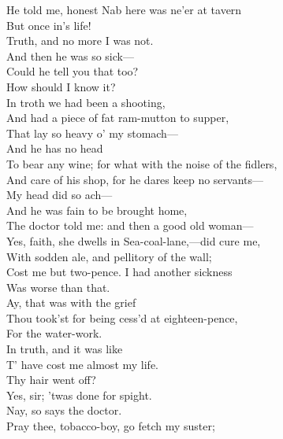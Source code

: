 \documentclass[a4paper,oneside]{memoir}
\begin{document}
\begin{drama*}
He told me, honest Nab here was ne'er at tavern\\
But once in's life!\\
\druggerspeaks {} Truth, and no more I was not.\\
\facespeaks And then he was so sick---\\
\druggerspeaks {} Could he tell you that too?\\
\facespeaks How should I know it?\\
\druggerspeaks {} In troth we had been a shooting,\\
And had a piece of fat ram-mutton to supper,\\
That lay so heavy o' my stomach---\\
\facespeaks {} And he has no head\\
To bear any wine; for what with the noise of the fidlers,\\
And care of his shop, for he dares keep no servants---\\
\druggerspeaks My head did so ach---\\
\facespeaks {} And he was fain to be brought home,\\
The doctor told me: and then a good old woman---\\
\druggerspeaks Yes, faith, she dwells in Sea-coal-lane,---did cure me,\\
With sodden ale, and pellitory of the wall;\\
Cost me but two-pence. I had another sickness\\
Was worse than that.\\
\facespeaks {} Ay, that was with the grief\\
Thou took'st for being cess'd at eighteen-pence,\\
For the water-work.\\
\druggerspeaks {} In truth, and it was like\\
T' have cost me almost my life.\\
\facespeaks {} Thy hair went off?\\
\druggerspeaks Yes, sir; 'twas done for spight.\\
\facespeaks {} Nay, so says the doctor.\\
\kastrilspeaks Pray thee, tobacco-boy, go fetch my suster;\\

\end{drama*}
\end{document}
